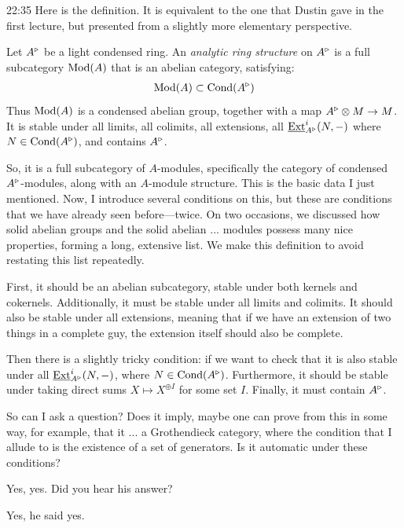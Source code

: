 \begin{unfinished}{22:35}
Here is the definition. It is equivalent to the one that Dustin gave in the first lecture, but presented from a slightly more elementary perspective.

Let $A^\triangleright$ be a light condensed ring. An \textit{analytic ring structure} on $A^\triangleright$ is a full subcategory $\operatorname{Mod}(A)$ that is an abelian category, satisfying:
\begin{align*}
\operatorname{Mod}(A) \subset \mathrm{Cond}(A^\triangleright)
\end{align*}
Thus $\operatorname{Mod}(A)$ is a condensed abelian group, together with a map $A^\triangleright \otimes M \to M$.
It is stable under all limits, all colimits, all extensions, all $\operatorname{\underline{Ext}}^i_{A^\triangleright}(N,-)$ where $N \in \mathrm{Cond}(A^\triangleright)$, and contains $A^\triangleright$.
\ed

So, it is a full subcategory of $A$-modules, specifically the category of condensed $A^\triangleright$-modules, along with an $A$-module structure. 
This is the basic data I just mentioned. Now, I introduce several conditions on this, but these are conditions that we have already seen before---twice. 
On two occasions, we discussed how solid abelian groups and the solid abelian ...  modules possess many nice properties, forming a long, extensive list.
We make this definition to avoid restating this list repeatedly.

First, it should be an abelian subcategory, stable under both kernels and cokernels. Additionally, it must be stable under all limits and colimits. It should also be stable under all extensions, meaning that if we have an extension of two things in a complete guy, the extension itself should also be complete.

Then there is a slightly tricky condition: if we want to check that it is also stable under all $\operatorname{\underline{Ext}}^i_{A^\triangleright}(N,-)$, where $N \in \mathrm{Cond}(A^\triangleright)$. Furthermore, it should be stable under taking direct sums $X \mapsto X^{\oplus I}$ for some set $I$. Finally, it must contain $A^\triangleright$.

\clausen So can I ask a question? Does it imply, maybe one can prove from this in some way, for example, that it ... a Grothendieck category, where the condition that I allude to is the existence of a set of generators. Is it automatic under these conditions?

\scholze Yes, yes. Did you hear his answer?

\clausen Yes, he said yes.


\end{unfinished}
